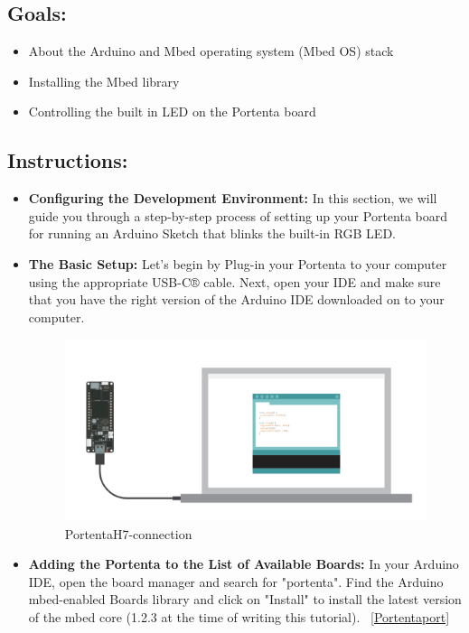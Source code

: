 	\subsection{Goals:}
		\begin{itemize}
			\item About the Arduino and Mbed operating system (Mbed OS) stack
			\item Installing the Mbed library
			\item Controlling the built in LED on the Portenta board
		\end{itemize}
	\subsection{Instructions:}
		\begin{itemize}
			\item \textbf{Configuring the Development Environment:} In this section, we will guide you through a step-by-step process of setting up your Portenta board for running an Arduino Sketch that blinks the built-in RGB LED.
			\item \textbf{The Basic Setup:} Let's begin by Plug-in your Portenta to your computer using the appropriate USB-C® cable. Next, open your IDE and make sure that you have the right version of the Arduino IDE downloaded on to your computer.
				\begin{figure}
					\begin{center}
						\includegraphics[width=0.7\linewidth]{Images/PortentaH7/PortentaH7-connection.png}
						\caption{PortentaH7-connection}
						\label{PortentaH7-connection}
					\end{center}
				\end{figure}
			\item \textbf{Adding the Portenta to the List of Available Boards:} In your Arduino IDE, open the board manager and search for "portenta". Find the Arduino mbed-enabled Boards library and click on "Install" to install the latest version of the mbed core (1.2.3 at the time of writing this tutorial). ~\ref{Portentaport}

\end{itemize}
